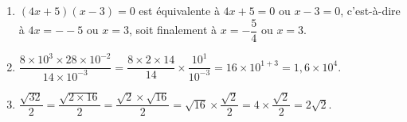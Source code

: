
\medskip

%
%
%
\begin{enumerate}
\item $(4x + 5)(x - 3) = 0$ est équivalente à $4x + 5 = 0$ ou $x - 3 = 0$, c'est-à-dire à $4x = - - 5$ ou $x = 3$, soit finalement à $x = - \dfrac{5}{4}$ ou $x = 3$.
\item $\dfrac{8 \times 10^3 \times 28 \times 10^{-2}}{14 \times 10^{- 3}} = \dfrac{8 \times 2 \times 14}{14} \times \dfrac{10^1}{10^{-3}} = 16 \times 10^{1 + 3} = 1,6 \times 10^4$.
\item $\dfrac{\sqrt{32}}{2} = \dfrac{\sqrt{2 \times 16}}{2} = \dfrac{\sqrt{2}\times \sqrt{16}}{2} = \sqrt{16}\times \dfrac{\sqrt{2}}{2} = 4 \times \dfrac{\sqrt{2}}{2} = 2\sqrt{2}$.
\end{enumerate}

\vspace{0,25cm}

